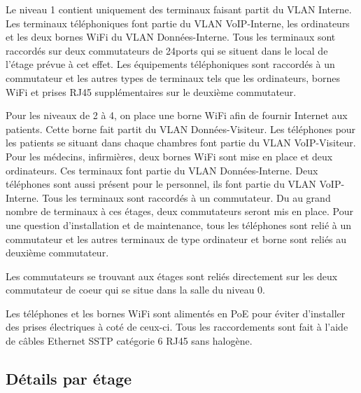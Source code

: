 Le niveau 1 contient uniquement des terminaux faisant partit du VLAN Interne. Les terminaux téléphoniques font partie du VLAN VoIP-Interne, les ordinateurs et les deux bornes WiFi du VLAN Données-Interne. Tous les terminaux sont raccordés sur deux commutateurs de 24ports qui se situent dans le local de l'étage prévue à cet effet. Les équipements téléphoniques sont raccordés à un commutateur et les autres types de terminaux tels que les ordinateurs, bornes WiFi et prises RJ45 supplémentaires sur le deuxième commutateur.


Pour les niveaux de 2 à 4, on place une borne WiFi afin de fournir Internet aux patients. Cette borne fait partit du VLAN Données-Visiteur. Les téléphones pour les patients se situant dans chaque chambres font partie du VLAN VoIP-Visiteur.
Pour les médecins, infirmières, deux bornes WiFi sont mise en place et deux ordinateurs. Ces terminaux font partie du VLAN Données-Interne.
Deux téléphones sont aussi présent pour le personnel, ils font partie du VLAN VoIP-Interne.
Tous les terminaux sont raccordés à un commutateur. Du au grand nombre de terminaux à ces étages, deux commutateurs seront mis en place. Pour une question d'installation et de maintenance, tous les téléphones sont relié à un commutateur et les autres terminaux de type ordinateur et borne sont reliés au deuxième commutateur.

Les commutateurs se trouvant aux étages sont reliés directement sur les  deux commutateur de coeur qui se situe dans la salle du niveau 0.

Les téléphones et les bornes WiFi sont alimentés en PoE pour éviter d'installer des prises électriques à coté de ceux-ci.
Tous les raccordements sont fait à l'aide de câbles Ethernet SSTP catégorie 6 RJ45 sans halogène.

%
%
\subsection{Détails par étage}

